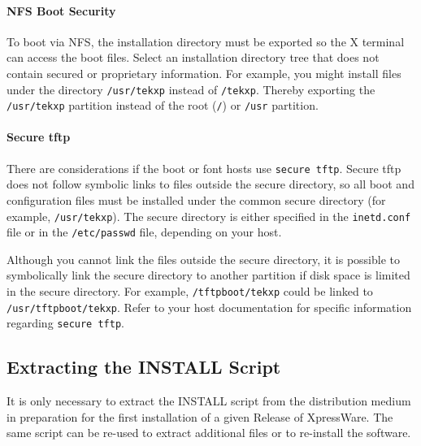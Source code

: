 \documentclass[11pt]{article}
\begin{document}
\paragraph {NFS Boot Security}

To boot via NFS, the installation directory must be exported so the X terminal
can access the boot files. Select an installation directory tree that does not
contain secured or proprietary information. For example, you might install
files under the directory {\tt /usr/tekxp} instead of {\tt /tekxp}. Thereby
exporting the {\tt /usr/tekxp} partition instead of the root ({\tt /}) or
{\tt /usr} partition.

\paragraph {Secure tftp}

There are considerations if the boot or font hosts use {\tt secure tftp}. Secure
tftp does not follow symbolic links to files outside the secure directory, so
all boot and configuration files must be installed under the common secure
directory (for example, {\tt /usr/tekxp}). The secure directory is either
specified in the {\tt inetd.conf} file or in the {\tt /etc/passwd} file,
depending on your host.

Although you cannot link the files outside the secure directory, it is possible
to symbolically link the secure directory to another partition if disk space is
limited in the secure directory. For example, {\tt /tftpboot/tekxp} could be
linked to {\tt /usr/tftpboot/tekxp}. Refer to your host documentation for
specific information regarding {\tt secure tftp}.


\subsection {Extracting the INSTALL Script}

It is only necessary to extract the INSTALL script from the distribution medium
in preparation for the first installation of a given Release of XpressWare.
The same script can be re-used to extract additional files or to re-install the
software.
\end{document}
